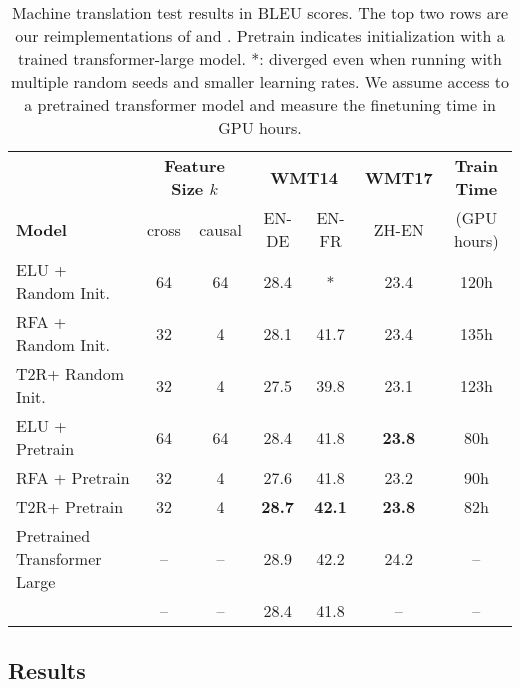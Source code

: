 \documentclass[11pt]{article}
\newcommand{\TRNN}{T2R\xspace}
\begin{document}
\begin{table*}[h]
\centering
\addtolength{\tabcolsep}{-0.0pt}  
\begin{tabular}{@{} lcccccc @{}}
\toprule
&  \multicolumn{2}{c}{\textbf{Feature Size $k$}} &  
\multicolumn{2}{c}{\textbf{WMT14}} &  \textbf{WMT17} & \textbf{Train Time}\\ 
\cmidrule(lr){2-3} \cmidrule(lr){4-5}  \cmidrule(lr){6-6}
\textbf{Model} & cross & causal  & EN-DE & EN-FR & ZH-EN & (GPU hours)\\
 \hline
ELU + Random Init.\ & 64 & 64 & 28.4 & * & 23.4 & 120h \\
RFA + Random Init.\ & 32 & 4 & 28.1 & 41.7& 23.4 &135h\\
\TRNN + Random Init.\ &32 &  4 & 27.5 & 39.8 & 23.1 & 123h\\

\hdashline
ELU + Pretrain & 64 & 64 & 28.4&41.8 & \textbf{23.8} & 80h\\
RFA + Pretrain & 32 & 4 & 27.6 & 41.8 &23.2 & 90h \\
\TRNN + Pretrain & 32 & 4& \textbf{28.7} &\textbf{42.1} & \textbf{23.8} & 82h\\
\hline
Pretrained Transformer Large & -- & --& 28.9 & 42.2 & 24.2  & --\\
\citet{Vaswani2017AttentionIA} & -- &-- &  28.4 & 41.8 & -- & -- \\
\bottomrule
\end{tabular}
\caption{Machine translation test results in BLEU scores. The top two rows are our reimplementations of \citet{katharopoulos-et-al-2020} and \citet{RFA}. Pretrain indicates initialization with a trained transformer-large model.
*: diverged even when running with multiple random seeds and smaller learning rates. We assume access to a pretrained transformer model and measure the finetuning time in GPU hours.}
\label{mt_results}
\end{table*}
\subsection{Results}
\label{sec:results}
\end{document}
